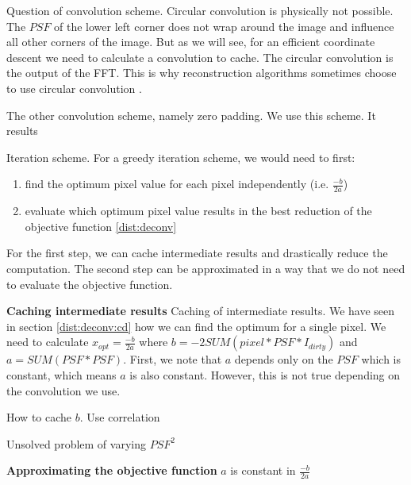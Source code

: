 Question of convolution scheme. 
Circular convolution is physically not possible. The $PSF$ of the lower left corner does not wrap around the image and influence all other corners of the image. But as we will see, for an efficient coordinate descent we need to calculate a convolution to cache. The circular convolution is the output of the FFT. This is why reconstruction algorithms sometimes choose to use circular convolution \cite{ferrari2014distributed}.

The other convolution scheme, namely zero padding. We use this scheme. It results 

Iteration scheme. For a greedy iteration scheme, we would need to first:
\begin{enumerate}
	\item find the optimum pixel value for each pixel independently (i.e. $\frac{-b}{2a}$)
	\item evaluate which optimum pixel value results in the best reduction of the objective function \eqref{dist:deconv}
\end{enumerate}

For the first step, we can cache intermediate results and drastically reduce the computation. The second step can be approximated in a way that we do not need to evaluate the objective function.

\textbf{Caching intermediate results}
Caching of intermediate results. We have seen in section \ref{dist:deconv:cd} how we can find the optimum for a single pixel. We need to calculate  $x_{opt} = \frac{-b}{2a}$ where  $b = -2 SUM( pixel*PSF*I_{dirty})$ and $a = SUM(PSF * PSF)$. First, we note that $a$ depends only on the $PSF$ which is constant, which means $a$ is also constant. However, this is not true depending on the convolution we use.

How to cache $b$. Use correlation


Unsolved problem of varying $PSF^2$

\textbf{Approximating the objective function}
$a$ is constant in $\frac{-b}{2a}$




